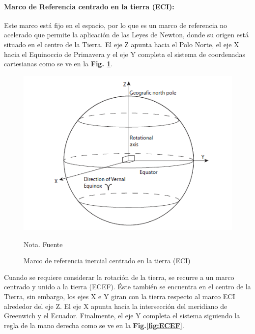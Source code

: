 \paragraph{Marco de Referencia centrado en la tierra (ECI):}Este marco está fijo en el espacio, por lo que es un marco de referencia no acelerado que permite la aplicación de las Leyes de Newton, donde su origen está situado en el centro de la Tierra. El eje Z apunta hacia el Polo Norte, el eje X hacia el Equinoccio de Primavera y el eje Y completa el sistema de coordenadas cartesianas como se ve en la \textbf{Fig. \ref{fig:ECI}}.
 
 \begin{figure}[!ht]
 	\begin{center}
 		\includegraphics[scale=0.7]{imagenes/marco_teorico/ECI.PNG}\\
 	\end{center}
 	\caption{ Marco de referencia inercial centrado en la tierra (ECI)}
 	\label{fig:ECI}
 	\footnotesize{Nota. Fuente \cite{Andresen2005}}
 \end{figure}
 
Cuando se requiere considerar la rotación de la tierra, se recurre a un marco centrado y unido a la tierra (ECEF). Éste también se encuentra en el centro de la Tierra, sin embargo, los ejes X e Y giran con la tierra respecto al marco ECI alrededor del eje Z. El eje X apunta hacia la intersección del meridiano de Greenwich y el Ecuador. Finalmente, el eje Y completa el sistema siguiendo la regla de la mano derecha como se ve en la \textbf{Fig.\ref{fig:ECEF}}.


